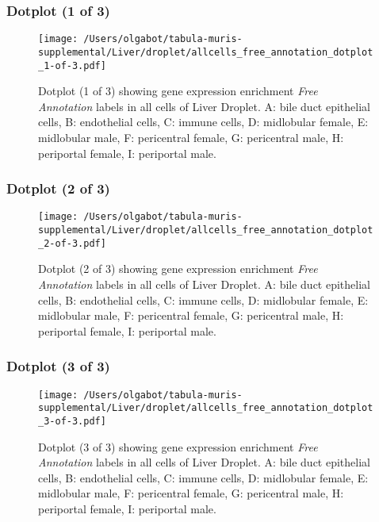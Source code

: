 \clearpage

\subsubsection{Dotplot (1 of 3)}
\begin{figure}[h]
\centering
\texttt{[image: /Users/olgabot/tabula-muris-supplemental/Liver/droplet/allcells\_free\_annotation\_dotplot\_1-of-3.pdf]}

\caption{ Dotplot (1 of 3)  showing gene expression enrichment \emph{Free Annotation} labels in all cells of Liver Droplet. A: bile duct epithelial cells, B: endothelial cells, C: immune cells, D: midlobular female, E: midlobular male, F: pericentral female, G: pericentral male, H: periportal female, I: periportal male.}
\end{figure}


\clearpage

\subsubsection{Dotplot (2 of 3)}
\begin{figure}[h]
\centering
\texttt{[image: /Users/olgabot/tabula-muris-supplemental/Liver/droplet/allcells\_free\_annotation\_dotplot\_2-of-3.pdf]}

\caption{ Dotplot (2 of 3)  showing gene expression enrichment \emph{Free Annotation} labels in all cells of Liver Droplet. A: bile duct epithelial cells, B: endothelial cells, C: immune cells, D: midlobular female, E: midlobular male, F: pericentral female, G: pericentral male, H: periportal female, I: periportal male.}
\end{figure}


\clearpage

\subsubsection{Dotplot (3 of 3)}
\begin{figure}[h]
\centering
\texttt{[image: /Users/olgabot/tabula-muris-supplemental/Liver/droplet/allcells\_free\_annotation\_dotplot\_3-of-3.pdf]}

\caption{ Dotplot (3 of 3)  showing gene expression enrichment \emph{Free Annotation} labels in all cells of Liver Droplet. A: bile duct epithelial cells, B: endothelial cells, C: immune cells, D: midlobular female, E: midlobular male, F: pericentral female, G: pericentral male, H: periportal female, I: periportal male.}
\end{figure}


